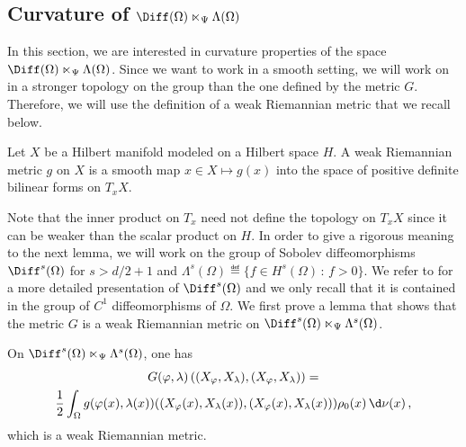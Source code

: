 \subsection{Curvature of $\Diff(\Omega) \ltimes_\Psi \Lambda(\Omega)$}
In this section, we are interested in curvature properties of the space $\Diff(\Omega) \ltimes_\Psi \Lambda(\Omega)$. %
Since we want to work in a smooth setting, we will work on in a stronger topology on the group than the one defined by the metric $G$. Therefore, we will use the definition of a weak Riemannian metric \cite[Section 9]{em70} that we recall below.
\begin{definition}
Let $X$ be a Hilbert manifold modeled on a Hilbert space $H$. A weak Riemannian metric $g$ on $X$ is a smooth map $x \in X \mapsto g(x)$ into the space of positive definite bilinear forms on $T_xX$.
\end{definition}
Note that  the inner product on $T_x$ need not define the topology on $T_xX$ since it can be weaker than the scalar product on $H$.
In order to give a rigorous meaning to the next lemma, we will work on the group of Sobolev diffeomorphisms $\Diff^{s}(\Omega)$ for $s> d/2+1$ and $\Lambda^s(\Omega) \eqdef \{  f \in H^s(\Omega) \, : \, f > 0\}$. We refer to \cite{BruverisVialard} for a more detailed presentation of $\Diff^{s}(\Omega)$ and we only recall that it is contained in the group of $C^1$ diffeomorphisms of $\Omega$. 
We first prove a lemma that shows that the metric $G$ is a weak Riemannian metric on $\Diff^{s}(\Omega) \ltimes_\Psi \Lambda^s(\Omega)$. %
\begin{lemma}\label{L2Norm}
On $\Diff^{s}(\Omega) \ltimes_\Psi \Lambda^s(\Omega)$, one has
\begin{multline}\label{SimplifiedG}
G(\varphi,\lambda)\left((X_\varphi,X_\lambda) , (X_\varphi,X_\lambda)\right) = \\ \frac{1}{2} \int_{\Omega} g(\varphi(x),\lambda(x))((X_\varphi(x),X_\lambda(x)),(X_\varphi(x),X_\lambda(x)))  \rho_0(x) \, \d \nu(x) \,,
\end{multline}
which is a weak Riemannian metric.
\end{lemma}

